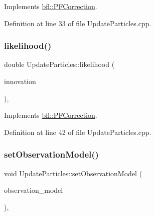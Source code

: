 Implements \mbox{\hyperlink{classbfl_1_1PFCorrection_a22e803c147f8fb45b7b98c854a947057}{bfl\+::\+P\+F\+Correction}}.



Definition at line 33 of file Update\+Particles.\+cpp.

\mbox{\label{classbfl_1_1UpdateParticles_a262b9de317562f0361f2db68312b8e27}} 
\subsubsection{\texorpdfstring{likelihood()}{likelihood()}}
{\footnotesize\ttfamily double Update\+Particles\+::likelihood (\begin{DoxyParamCaption}\item[{const Eigen\+::\+Ref$<$ const Eigen\+::\+Vector\+Xf $>$ \&}]{innovation }\end{DoxyParamCaption})\hspace{0.3cm}{\ttfamily [override]}, {\ttfamily [virtual]}}



Implements \mbox{\hyperlink{classbfl_1_1PFCorrection_a4310e630d4c269bd66557e44e5deecb0}{bfl\+::\+P\+F\+Correction}}.



Definition at line 42 of file Update\+Particles.\+cpp.

\mbox{\label{classbfl_1_1UpdateParticles_a89e61d253d077f5c4ca0be6e3b56edd3}} 
\subsubsection{\texorpdfstring{set\+Observation\+Model()}{setObservationModel()}}
{\footnotesize\ttfamily void Update\+Particles\+::set\+Observation\+Model (\begin{DoxyParamCaption}\item[{std\+::unique\+\_\+ptr$<$ \mbox{\hyperlink{classbfl_1_1ObservationModel}{Observation\+Model}} $>$}]{observation\+\_\+model }\end{DoxyParamCaption})\hspace{0.3cm}{\ttfamily [override]}, {\ttfamily [virtual]}}



